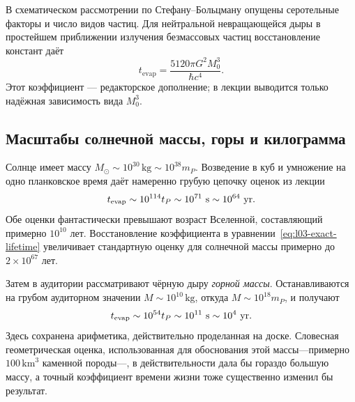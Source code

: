 В схематическом рассмотрении по Стефану--Больцману опущены серотельные факторы и число видов частиц. Для нейтральной невращающейся дыры в простейшем приближении излучения безмассовых частиц восстановление констант даёт
\begin{equation}
t_{\mathrm{evap}}
=\frac{5120\pi G^2M_0^3}{\hbar c^4}.
\label{eq:l03-exact-lifetime}
\end{equation}
Этот коэффициент — редакторское дополнение; в лекции выводится только надёжная зависимость вида \(M_0^3\).

\subsection{Масштабы солнечной массы, горы и килограмма}

Солнце имеет массу \(M_\odot\sim10^{30}\,\mathrm{kg}\sim10^{38}m_P\). Возведение в куб и умножение на одно планковское время даёт намеренно грубую цепочку оценок из лекции
\begin{equation}
t_{\mathrm{evap}}\sim10^{114}t_P
\sim10^{71}\ {\rm s}
\sim10^{64}\ {\rm yr}.
\end{equation}
Обе оценки фантастически превышают возраст Вселенной, составляющий примерно \(10^{10}\) лет. Восстановление коэффициента в уравнении~\eqref{eq:l03-exact-lifetime} увеличивает стандартную оценку для солнечной массы примерно до \(2\times10^{67}\) лет.

Затем в аудитории рассматривают чёрную дыру \emph{горной массы}. Останавливаются на грубом аудиторном значении \(M\sim10^{10}\,\mathrm{kg}\), откуда \(M\sim10^{18}m_P\), и получают
\begin{equation}
t_{\mathrm{evap}}\sim10^{54}t_P
\sim10^{11}\ {\rm s}
\sim10^4\ {\rm yr}.
\end{equation}
Здесь сохранена арифметика, действительно проделанная на доске. Словесная геометрическая оценка, использованная для обоснования этой массы---примерно \(100\,\mathrm{km}^3\) каменной породы---, в действительности дала бы гораздо большую массу, а точный коэффициент времени жизни тоже существенно изменил бы результат.

